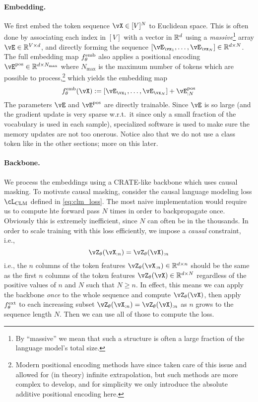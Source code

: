 \documentclass[\toplevelprefix/book-main.tex]{subfiles}
\begin{document}
\paragraph{Embedding.} We first embed the token sequence \(\vX \in [V]^{N}\) to Euclidean space. This is often done by associating each index in \([V]\) with a vector in \(\mathbb{R}^{d}\) using a \textit{massive}\footnote{By ``massive'' we mean that such a structure is often a large fraction of the language model's total size.} array \(\vE \in \R^{V \times d}\), and directly forming the sequence \([\vE_{\vx_{1}}, \dots, \vE_{\vx_{N}}] \in \R^{d \times N}\). The full embedding map \(f_{\theta}^{\mathrm{emb}}\) also applies a positional encoding \(\vE^{\pos} \in \R^{d  \times N_{\max}}\) where \(N_{\max}\) is the maximum number of tokens which are possible to process,\footnote{Modern positional encoding methods have since taken care of this issue and allowed for (in theory) infinite extrapolation, but such methods are more complex to develop, and for simplicity we only introduce the absolute additive positional encoding here.} which yields the embedding map 
\begin{equation}
    f_{\theta}^{\emb}(\vX) := [\vE_{\vx_{1}}, \dots, \vE_{\vx_{N}}] + \vE_{:N}^{\pos}
\end{equation}
The parameters \(\vE\) and \(\vE^{\pos}\) are directly trainable. Since \(\vE\) is so large (and the gradient update is very sparse w.r.t.~it since only a small fraction of the vocabulary is used in each sample), specialized software is used to make sure the memory updates are not too onerous. Notice also that we do not use a class token like in the other sections; more on this later.

\paragraph{Backbone.} We process the embeddings using a CRATE-like backbone which uses causal masking. To motivate causal masking, consider the causal language modeling loss \(\cL_{\mathrm{CLM}}\) defined in \eqref{eq:clm_loss}. The most naive implementation would require us to compute hte forward pass \(N\) times in order to backpropagate once. Obviously this is extremely inefficient, since \(N\) can often be in the thousands. In order to scale training with this loss efficiently, we impose a \textit{causal} constraint, i.e.,
\begin{equation}\label{eq:causal_backbone_def}
    \vZ_{\theta}(\vX_{:n}) = \vZ_{\theta}(\vX)_{:n}
\end{equation}
i.e., the \(n\) columns of the token features \(\vZ_{\theta}(\vX_{:n}) \in \R^{d \times n}\) should be the same as the first \(n\) columns of the token features \(\vZ_{\theta}(\vX) \in \R^{d \times N}\) regardless of the positive values of \(n\) and \(N\) such that \(N \geq n\). In effect, this means we can apply the backbone \textit{once} to the whole sequence and compute \(\vZ_{\theta}(\vX)\), then apply \(f_{\theta}^{\mathrm{ext}}\) to each increasing subset \(\vZ_{\theta}(\vX_{:n}) = \vZ_{\theta}(\vX)_{:n}\) as \(n\) grows to the sequence length \(N\). Then we can use all of those to compute the loss.
\end{document}
